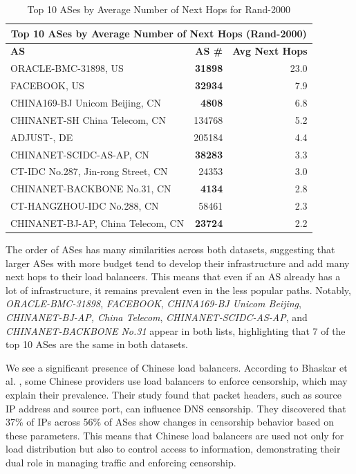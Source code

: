 \documentclass[12pt]{cwru_thesis}
\begin{document}
\begin{table}[h!]
    \centering
    \begin{tabularx}{\textwidth}{|X|r|r|}
        \hline
        \multicolumn{3}{|c|}{\textbf{Top 10 ASes by Average Number of Next Hops (Rand-2000)}} \\
        \hline
        \textbf{AS} & \textbf{AS \#} & \textbf{Avg Next Hops} \\
        \hline
        ORACLE-BMC-31898, US & \textbf{31898} & 23.0 \\
        FACEBOOK, US & \textbf{32934} & 7.9 \\
        CHINA169-BJ Unicom Beijing, CN & \textbf{4808} & 6.8 \\
        CHINANET-SH China Telecom, CN & 134768 & 5.2 \\
        ADJUST-, DE & 205184 & 4.4 \\
        CHINANET-SCIDC-AS-AP, CN & \textbf{38283} & 3.3 \\
        CT-IDC No.287, Jin-rong Street, CN & 24353 & 3.0 \\
        CHINANET-BACKBONE No.31, CN & \textbf{4134} & 2.8 \\
        CT-HANGZHOU-IDC No.288, CN & 58461 & 2.3 \\
        CHINANET-BJ-AP, China Telecom, CN & \textbf{23724} & 2.2 \\
        \hline
    \end{tabularx}
    \caption{Top 10 ASes by Average Number of Next Hops for Rand-2000}
    \label{tab:rand2000_as_next_hops}
\end{table}

The order of ASes has many similarities across both datasets, suggesting that larger ASes with more budget tend to develop their infrastructure and add many next hops to their load balancers. This means that even if an AS already has a lot of infrastructure, it remains prevalent even in the less popular paths. Notably, \textit{ORACLE-BMC-31898}, \textit{FACEBOOK}, \textit{CHINA169-BJ Unicom Beijing}, \textit{CHINANET-BJ-AP, China Telecom}, \textit{CHINANET-SCIDC-AS-AP}, and \textit{CHINANET-BACKBONE No.31} appear in both lists, highlighting that 7 of the top 10 ASes are the same in both datasets.



We see a significant presence of Chinese load balancers. According to Bhaskar et al.  \cite{bhaskar2021}, some Chinese providers use load balancers to enforce censorship, which may explain their prevalence. Their study found that packet headers, such as source IP address and source port, can influence DNS censorship. They discovered that 37\% of IPs across 56\% of ASes show changes in censorship behavior based on these parameters. This means that Chinese load balancers are used not only for load distribution but also to control access to information, demonstrating their dual role in managing traffic and enforcing censorship.
\end{document}

